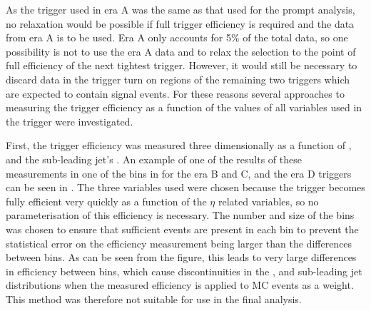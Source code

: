 As the trigger used in era A was the same as that used for the prompt analysis, no relaxation would be possible if full trigger efficiency is required and the data from era A is to be used. Era A only accounts for 5\% of the total data, so one possibility is not to use the era A data and to relax the selection to the point of full efficiency of the next tightest trigger. However, it would still be necessary to discard data in the trigger turn on regions of the remaining two triggers which are expected to contain signal events. For these reasons several approaches to measuring the trigger efficiency as a function of the values of all variables used in the trigger were investigated.

First, the trigger efficiency was measured three dimensionally as a function of \METnoMU, \Mjj and the sub-leading jet's \pt. An example of one of the results of these measurements in one of the bins in \METnoMU for the era B and C, and the era D triggers can be seen in . The three variables used were chosen because the trigger becomes fully efficient very quickly as a function of the $\eta$ related variables, so no parameterisation of this efficiency is necessary. The number and size of the bins was chosen to ensure that sufficient events are present in each bin to prevent the statistical error on the efficiency measurement being larger than the differences between bins. As can be seen from the figure, this leads to very large differences in efficiency between bins, which cause discontinuities in the \METnoMU, \Mjj and sub-leading jet \pt distributions when the measured efficiency is applied to \ac{MC} events as a weight. This method was therefore not suitable for use in the final analysis.
